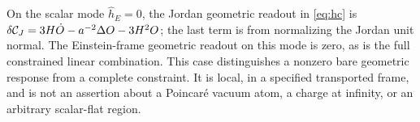 On the scalar mode \(\widehat h_E=0\), the Jordan geometric readout in \eqref{eq:hc} is \(\delta{\cal C}_J=3H\dot O-a^{-2}\Delta O-3H^2O\); the last term is from normalizing the Jordan unit normal. The Einstein-frame geometric readout on this mode is zero, as is the full constrained linear combination. This case distinguishes a nonzero bare geometric response from a complete constraint. It is local, in a specified transported frame, and is not an assertion about a Poincar\'e vacuum atom, a charge at infinity, or an arbitrary scalar-flat region.
